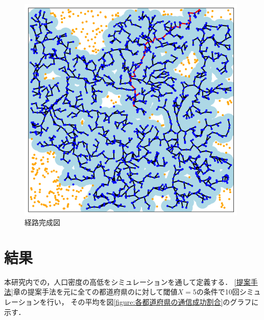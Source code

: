 \documentclass[a4paper, 11pt]{ltjsarticle}
\begin{document}
\begin{enumerate}[label=\textbf{(\arabic*)}]
        \begin{figure}[H]
          \centering
          \includegraphics[width=110mm]{4_step.png}
          \caption{経路完成図}
          \label{figure:fourth_step}
        \end{figure}
\end{enumerate}




\clearpage
\section{結果}
本研究内での，人口密度の高低をシミュレーションを通して定義する．
\ref{提案手法}章の提案手法を元に全ての都道府県のに対して閾値$X = 5$の条件で10回シミュレーションを行い，
その平均を図\ref{figure:各都道府県の通信成功割合}のグラフに示す．
\end{document}
